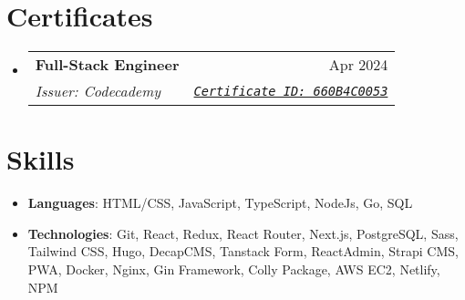 \documentclass[letterpaper,11pt]{article}
\makeatletter
\newcommand{\resumeSubheading}[4]{
  \vspace{-1pt}\item
    \begin{tabular*}{0.97\textwidth}[t]{l@{\extracolsep{\fill}}r}
      \textbf{#1} & #2 \\
      \textit{\small#3} & \textit{\small #4} \\
    \end{tabular*}\vspace{-5pt}
}
\newcommand{\resumeSubHeadingListStart}{\begin{itemize}[leftmargin=*]}
\newcommand{\resumeSubHeadingListEnd}{\end{itemize}}
\newcommand{\resumeCertificate}[5]{
  \resumeSubheading
    {#1}{#2}
    {\vspace{-1pt}Issuer: #3}{\href{#4}{\texttt{#5}}}
}
\makeatother
\begin{document}
\section{Certificates}
  \resumeSubHeadingListStart
    \resumeCertificate
      {Full-Stack Engineer}{Apr 2024}
      {Codecademy}
      {https://www.codecademy.com/profiles/BeksultanAbdikaarov/certificates/ffd0f42cce1a44e9a0108b365047a0a6}
      {Certificate ID: 660B4C0053}
    \resumeSubHeadingListEnd

\section{Skills}
 \resumeSubHeadingListStart
   \item{
     \textbf{Languages}{: HTML/CSS, JavaScript, TypeScript, NodeJs, Go, SQL}
   }
   \item{
     \textbf{Technologies}{: Git, React, Redux, React Router, Next.js, PostgreSQL, Sass, Tailwind CSS, Hugo, DecapCMS, Tanstack Form, ReactAdmin, Strapi CMS, PWA, Docker, Nginx, Gin Framework, Colly Package, AWS EC2, Netlify, NPM}
   }
 \resumeSubHeadingListEnd

\end{document}
